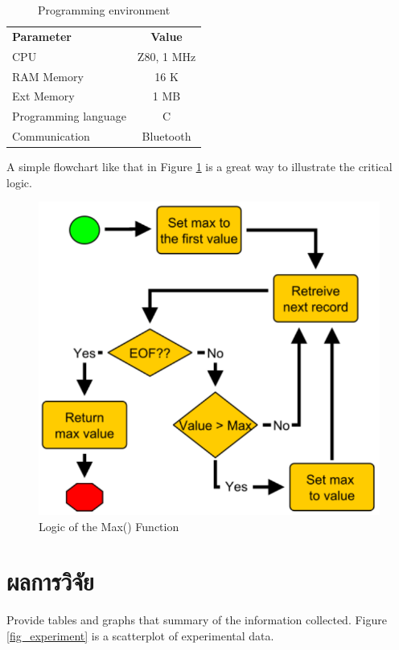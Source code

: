 \documentclass[10pt,twocolumn,twoside,a4paper]{article}
\begin{document}
\begin{table}
\caption{Programming environment}
\label{environment}
\begin{tabular}{lc}
\textbf{Parameter} & \textbf{Value}\\
CPU & Z80, 1 MHz\\
RAM Memory & 16 K\\
Ext Memory & 1 MB\\
Programming language & C \\
Communication& Bluetooth \\
\end{tabular}
\end{table}

A simple flowchart like that in Figure \ref{fig_flowchart} is a great way to illustrate the critical logic.

\begin{figure}[htb]
\centering
\includegraphics[width=\columnwidth]{img/flowchart.pdf}
\caption{Logic of the Max() Function}
\label{fig_flowchart}
\end{figure}

\section{ผลการวิจัย}
\label{results}

Provide tables and graphs that summary of the information collected. Figure \ref{fig_experiment}
is a scatterplot of experimental data. 
\end{document}
